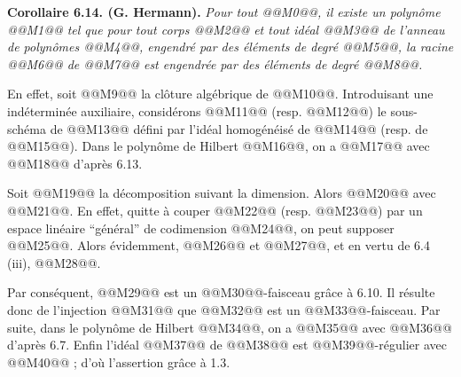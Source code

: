 
\textbf{Corollaire 6.14. (G. Hermann).} \emph{Pour tout @@M0@@, il existe un polyn\^ome @@M1@@ tel que pour tout corps @@M2@@ et tout id\'eal @@M3@@ de l'anneau de polyn\^omes @@M4@@, engendr\'e par des \'el\'ements de degr\'e @@M5@@, la racine @@M6@@ de @@M7@@ est engendr\'ee par des \'el\'ements de degr\'e @@M8@@.}

En effet, soit @@M9@@ la cl\^oture alg\'ebrique de @@M10@@. Introduisant une ind\'etermin\'ee auxiliaire, consid\'erons @@M11@@ (resp. @@M12@@) le sous-sch\'ema de @@M13@@ d\'efini par l'id\'eal homog\'en\'eis\'e de @@M14@@ (resp. de @@M15@@). Dans le polyn\^ome de Hilbert @@M16@@, on a @@M17@@ avec @@M18@@ d'apr\`es 6.13.

Soit @@M19@@ la d\'ecomposition suivant la dimension. Alors @@M20@@ avec @@M21@@. En effet, quitte \`a couper @@M22@@ (resp. @@M23@@) par un espace lin\'eaire ``g\'en\'eral'' de codimension @@M24@@, on peut supposer @@M25@@. Alors \'evidemment, @@M26@@ et @@M27@@, et en vertu de 6.4 (iii), @@M28@@.

Par cons\'equent, @@M29@@ est un @@M30@@-faisceau gr\^ace \`a 6.10. Il r\'esulte donc de l'injection @@M31@@ que @@M32@@ est un @@M33@@-faisceau. Par suite, dans le polyn\^ome de Hilbert @@M34@@, on a @@M35@@ avec @@M36@@ d'apr\`es 6.7. Enfin l'id\'eal @@M37@@ de @@M38@@ est @@M39@@-r\'egulier avec @@M40@@ ; d'o\`u l'assertion gr\^ace \`a 1.3.

